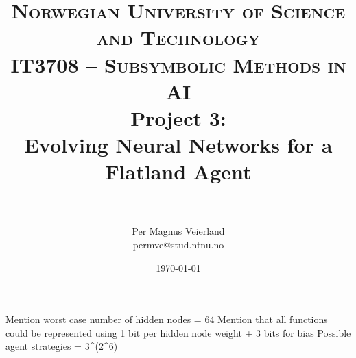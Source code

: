 

\title{
\normalfont \normalsize
\textsc{Norwegian University of Science and Technology\\IT3708 -- Subsymbolic Methods in AI}
\horrule{0.5pt} \\[0.4cm]
\huge Project 3:\\ Evolving Neural Networks for a Flatland Agent\\
\horrule{2pt} \\[0.5cm]
}

\author{Per Magnus Veierland\\permve@stud.ntnu.no}

\date{\normalsize\today}



\fancyfoot[C]{}
\maketitle


Mention worst case number of hidden nodes = 64
Mention that all functions could be represented using 1 bit per hidden node weight + 3 bits for bias
Possible agent strategies = 3^(2^6)



